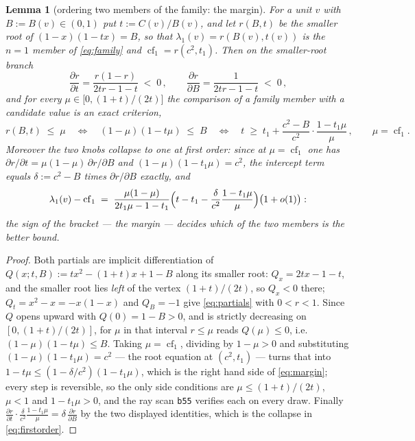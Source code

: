 \documentclass[11pt]{article}
\newtheorem{lemma}[theorem]{Lemma}
\theoremstyle{remark}
\begin{document}
\begin{lemma}[ordering two members of the family: the margin]\label{lem:margin}
For a unit $v$ with $B:=B(v)\in(0,1)$ put $t:=C(v)/B(v)$, and let $r(B,t)$ be the smaller root of
$(1-x)(1-tx)=B$, so that $\lambda_1(v)=r(B(v),t(v))$ is the $n=1$ member of \eqref{eq:family}
and $\operatorname{cf}_1=r(c^{2},t_1)$. Then on the smaller-root branch
\begin{equation}\label{eq:partials}
  \frac{\partial r}{\partial t}=\frac{r(1-r)}{2tr-1-t}\;<\;0\,,\qquad
  \frac{\partial r}{\partial B}=\frac{1}{2tr-1-t}\;<\;0\,,
\end{equation}
and for every $\mu\in\bigl[0,(1+t)/(2t)\bigr]$ the comparison of a family member with a candidate value
is an \emph{exact} criterion,
\begin{equation}\label{eq:margin}
  r(B,t)\;\le\;\mu\quad\Longleftrightarrow\quad(1-\mu)(1-t\mu)\;\le\;B
  \quad\Longleftrightarrow\quad
  t\;\ge\;t_1+\frac{c^{2}-B}{c^{2}}\cdot\frac{1-t_1\mu}{\mu}\,,\qquad\mu=\operatorname{cf}_1 .
\end{equation}
Moreover the two knobs collapse to \emph{one} at first order: since at $\mu=\operatorname{cf}_1$ one has
$\partial r/\partial t=\mu(1-\mu)\,\partial r/\partial B$ and $(1-\mu)(1-t_1\mu)=c^{2}$, the intercept
term equals $\delta:=c^{2}-B$ times $\partial r/\partial B$ exactly, and
\begin{equation}\label{eq:firstorder}
  \lambda_1(v)-\operatorname{cf}_1\;=\;\frac{\mu(1-\mu)}{2t_1\mu-1-t_1}
  \Bigl(t-t_1-\frac{\delta}{c^{2}}\frac{1-t_1\mu}{\mu}\Bigr)\bigl(1+o(1)\bigr):
\end{equation}
the sign of the bracket --- the \emph{margin} --- decides which of the two members is the better bound.
\end{lemma}

\begin{proof}
Both partials are implicit differentiation of $Q(x;t,B):=tx^{2}-(1+t)x+1-B$ along its smaller root:
$Q_x=2tx-1-t$, and the smaller root lies \emph{left} of the vertex $(1+t)/(2t)$, so $Q_x<0$ there;
$Q_t=x^{2}-x=-x(1-x)$ and $Q_B=-1$ give \eqref{eq:partials} with $0<r<1$. Since $Q$ opens upward with
$Q(0)=1-B>0$, and is strictly decreasing on $[0,(1+t)/(2t)]$, for $\mu$ in that interval $r\le\mu$
reads $Q(\mu)\le0$, i.e.\ $(1-\mu)(1-t\mu)\le B$. Taking $\mu=\operatorname{cf}_1$, dividing by
$1-\mu>0$ and substituting $(1-\mu)(1-t_1\mu)=c^{2}$ --- the root equation at $(c^{2},t_1)$ --- turns
that into $1-t\mu\le(1-\delta/c^{2})(1-t_1\mu)$, which is the right hand side of \eqref{eq:margin};
every step is reversible, so the only side conditions are $\mu\le(1+t)/(2t)$, $\mu<1$ and
$1-t_1\mu>0$, and the ray scan \texttt{b55} verifies each on every draw. Finally
$\frac{\partial r}{\partial t}\cdot\frac{\delta}{c^{2}}\frac{1-t_1\mu}{\mu}
=\delta\,\frac{\partial r}{\partial B}$ by the two displayed identities, which is the collapse in
\eqref{eq:firstorder}.
\end{proof}
\end{document}
